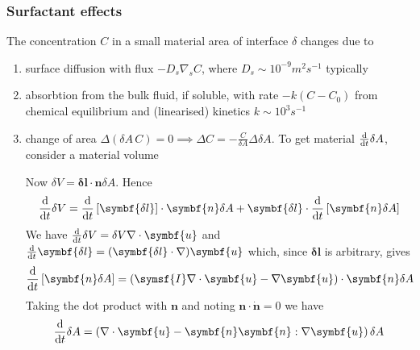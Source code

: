 \documentclass{jknotes}
\begin{document}
\subsubsection{Surfactant effects}
The concentration $C$ in a small material area of interface $\delta $ changes
due to
\begin{enumerate}
	\item surface diffusion with flux $- D_s \nabla_s C$, where $D_s \sim
		10^{-9} m^2 s^{-1}$ typically
	\item absorbtion from the bulk fluid, if soluble, with rate $-k(C-C_0)$
		from chemical equilibrium and (linearised) kinetics $k \sim 10^3
		s^{-1}$
	\item change of area $\Delta (\delta A\, C) = 0 \implies \Delta C =
		-\frac{C}{\delta A} \Delta \delta A$. To get material
		$\frac{\diffd}{\diffd t} \delta A$, consider a material volume
		\begin{center}
		\end{center}
		Now $\delta V = \symbf{\delta l} \cdot \symbf{n} \delta A$. Hence
		\begin{equation}
			\frac{\diffd}{\diffd t} \delta V = \frac{\diffd}{\diffd t}
			\left[\symbf{\delta l}\right] \cdot \symbf{n} \delta A + \symbf{\delta l} \cdot
			\frac{\diffd}{\diffd t}\left[ \symbf{n} \delta A\right]
		\end{equation}
		We have $\frac{\diffd}{\diffd t} \delta V = \delta V \nabla \cdot
		\symbf{u}$ and $\frac{\diffd}{\diffd t} \symbf{\delta l} =
		(\symbf{\delta l} \cdot \nabla) \symbf{u}$ which, since $\symbf{\delta
		l}$ is arbitrary, gives
		\begin{equation}
			\frac{\diffd}{\diffd t} \left[ \symbf{n} \delta A \right] = \left(
			\symsf{I} \nabla \cdot \symbf{u} - \nabla \symbf{u} \right) \cdot
			\symbf{n} \delta A
		\end{equation}
		Taking the dot product with $\symbf{n}$ and noting $\symbf{n} \cdot
		\dot{\symbf{n}} = 0$ we have
		\begin{align}
			\frac{\diffd}{\diffd t} \delta A &= \left( \nabla \cdot \symbf{u}
			- \symbf{n} \symbf{n} : \nabla \symbf{u}\right) \delta A \\

\end{align}
\end{enumerate}
\end{document}
